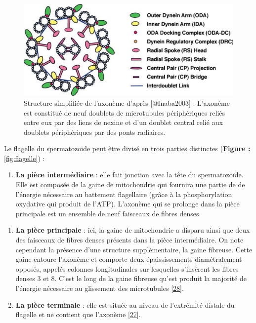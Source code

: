 \documentclass[12pt,twoside]{reedthesis}
\providecommand{\tightlist}{%
  \setlength{\itemsep}{0pt}\setlength{\parskip}{0pt}}
\theoremstyle{definition}
\theoremstyle{definition}
\theoremstyle{remark}
\begin{document}
  \begin{figure}
  
  {\centering \includegraphics[scale=.3]{figure/axoneme} 
  
  }
  
  \caption[Structure simplifiée de l'axonème]{Structure simplifiée de l'axonème d'après [@Inaba2003] : L'axonème est constitué de neuf doublets de microtubules périphériques reliés entre eux par des liens de nexine et d'un doublet central relié aux doublets périphériques par des ponts radiaires.}\label{fig:axoneme}
  \end{figure}
  
  Le flagelle du spermatozoïde peut être divisé en trois parties
  distinctes (\textbf{Figure : }\ref{fig:flagelle}) :
  
  \begin{enumerate}
  \def\labelenumi{\arabic{enumi}.}
  \tightlist
  \item
    \textbf{La pièce intermédiaire} : elle fait jonction avec la tête du
    spermatozoïde. Elle est composée de la gaine de mitochondrie qui
    fournira une partie de de l'énergie nécessaire au battement
    flagellaire (grâce à la phosphorylation oxydative qui produit de
    l'ATP). L'axonème qui se prolonge dans la pièce principale est un
    ensemble de neuf faisceaux de fibres denses.
  \end{enumerate}
  
  \newpage
  
  \begin{enumerate}
  \def\labelenumi{\arabic{enumi}.}
  \setcounter{enumi}{1}
  \tightlist
  \item
    \textbf{La pièce principale} : ici, la gaine de mitochondrie a disparu
    ainsi que deux des faisceaux de fibres denses présents dans la pièce
    intermédiaire. On note cependant la présence d'une structure
    supplémentaire, la gaine fibreuse. Cette gaine entoure l'axonème et
    comporte deux épaississements diamétralement opposés, appelés colonnes
    longitudinales sur lesquelles s'insèrent les fibres denses 3 et 8.
    C'est le long de la gaine fibreuse qu'est produit la majorité de
    l'énergie nécessaire au glissement des microtubules
    {[}\protect\hyperlink{ref-Eddy2007}{28}{]}.\\
  \item
    \textbf{La pièce terminale} : elle est située au niveau de l'extrémité
    distale du flagelle et ne contient que l'axonème
    {[}\protect\hyperlink{ref-Inaba2003}{27}{]}.
  \end{enumerate}
  
\end{document}
